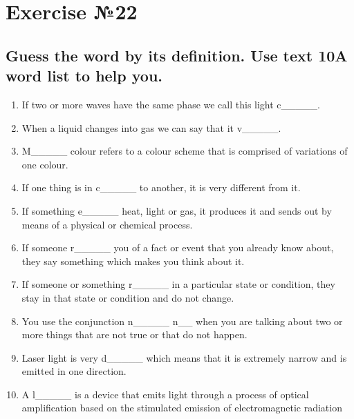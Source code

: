 \section*{Exercise №22}

\subsection*{Guess the word by its definition. Use text 10A word list to help you.}
\begin{enumerate}
      \item If two or more waves have the same phase we call this light c\_\_\_\_\_.
      \item When a liquid changes into gas we can say that it v\_\_\_\_\_.
      \item M\_\_\_\_\_ colour refers to a colour scheme that is comprised of variations
            of one colour.
      \item If one thing is in c\_\_\_\_\_ to another, it is very different from it.
      \item If something e\_\_\_\_\_ heat, light or gas, it produces it and sends out
            by means of a physical or chemical process.
      \item If someone r\_\_\_\_\_ you of a fact or event that you already know about,
            they say something which makes you think about it.
      \item If someone or something r\_\_\_\_\_ in a particular state or condition,
            they stay in that state or condition and do not change.
      \item You use the conjunction n\_\_\_\_\_ n\_\_ when you are talking about two
            or more things that are not true or that do not happen.
      \item Laser light is very d\_\_\_\_\_ which means that it is extremely narrow
            and is emitted in one direction.
      \item A l\_\_\_\_\_ is a device that emits light through a process of optical
            amplification based on the stimulated emission of electromagnetic radiation
\end{enumerate}

